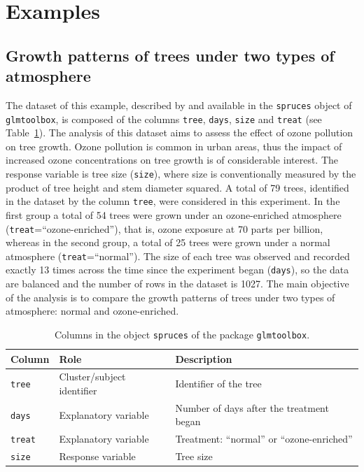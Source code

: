 \section{Examples}
\subsection{Growth patterns of trees under two types of atmosphere}
The dataset of this example, described by \cite{DDHLZ02} and available in the {\tt spruces} object of {\tt glmtoolbox}, is composed of the columns {\tt tree}, {\tt days}, {\tt size} and {\tt treat} (see Table~\ref{ts}). The analysis of this dataset aims to assess the effect of ozone pollution on tree growth. Ozone pollution is common in urban areas, thus the impact of increased ozone concentrations on tree growth is of considerable interest. The response variable is tree size ({\tt size}), where size is conventionally measured by the product of tree height and stem diameter squared. A total of 79 trees, identified in the dataset by the column {\tt tree}, were considered in this experiment. In the first group a total of 54 trees were grown under an ozone-enriched atmosphere ({\tt treat}=``ozone-enriched''), that is, ozone exposure at 70 parts per billion, whereas in the second group, a total of 25 trees were grown under a normal atmosphere ({\tt treat}=``normal''). The size of each tree was observed and recorded exactly 13 times across the time since the experiment began ({\tt days}), so the data are balanced and the number of rows in the dataset is 1027. The main objective of the analysis is to compare the growth patterns of trees under two types of atmosphere: normal and ozone-enriched.

\begin{table}[!ht]
{\small
\begin{center}
\begin{tabular}{lll} 
 \hline
Column & Role & Description\\ \hline
{\tt tree}  & Cluster/subject identifier & Identifier of the tree\\
{\tt days}  & Explanatory variable & Number of days after the treatment began\\
{\tt treat} & Explanatory variable & Treatment: ``normal'' or ``ozone-enriched''\\
{\tt size}  & Response variable & Tree size\\
\hline
\end{tabular}
\end{center}
\caption{Columns in the object {\tt spruces} of the package {\tt glmtoolbox}.}
\label{ts}}
\end{table}

